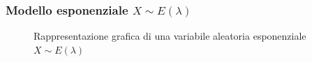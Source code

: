 \subsubsection{Modello esponenziale $X \sim E{(\lambda)}$}
\begin{figure}[h]
    \centering
{}
    \caption{Rappresentazione grafica di una variabile aleatoria esponenziale $X \sim E{(\lambda)}$}
    \label{fig:mod_expon}
    \vspace{\abovedisplayskip}
\end{figure}

